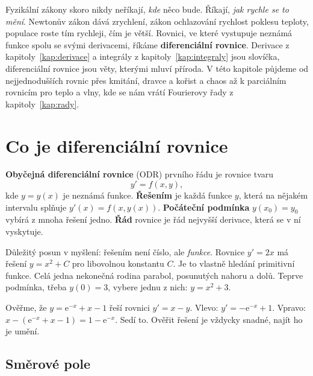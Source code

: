 \label{kap:diferencialni}

Fyzikální zákony skoro nikdy neříkají, \textit{kde} něco bude. Říkají, \textit{jak rychle se to mění}. Newtonův zákon dává zrychlení, zákon ochlazování rychlost poklesu teploty, populace roste tím rychleji, čím je větší. Rovnici, ve které vystupuje neznámá funkce spolu se svými derivacemi, říkáme \textbf{diferenciální rovnice}. Derivace z kapitoly~\ref{kap:derivace} a integrály z kapitoly~\ref{kap:integraly} jsou slovíčka, diferenciální rovnice jsou věty, kterými mluví příroda. V této kapitole půjdeme od nejjednodušších rovnic přes kmitání, dravce a kořist a chaos až k parciálním rovnicím pro teplo a vlny, kde se nám vrátí Fourierovy řady z kapitoly~\ref{kap:rady}.

\section{Co je diferenciální rovnice}

\begin{definitionbox}
  \textbf{Obyčejná diferenciální rovnice} (ODR) prvního řádu je rovnice tvaru
  \begin{equation*}
    y' = f(x, y),
  \end{equation*}
  kde $y = y(x)$ je neznámá funkce. \textbf{Řešením} je každá funkce $y$, která na nějakém intervalu splňuje $y'(x) = f(x, y(x))$. \textbf{Počáteční podmínka} $y(x_0) = y_0$ vybírá z mnoha řešení jedno. \textbf{Řád} rovnice je řád nejvyšší derivace, která se v ní vyskytuje.
\end{definitionbox}

Důležitý posun v myšlení: řešením není číslo, ale \textit{funkce}. Rovnice $y' = 2x$ má řešení $y = x^2 + C$ pro libovolnou konstantu $C$. Je to vlastně hledání primitivní funkce. Celá jedna nekonečná rodina parabol, posunutých nahoru a dolů. Teprve podmínka, třeba $y(0) = 3$, vybere jednu z nich: $y = x^2 + 3$.

\begin{example}
  Ověřme, že $y = \mathrm{e}^{-x} + x - 1$ řeší rovnici $y' = x - y$. Vlevo: $y' = -\mathrm{e}^{-x} + 1$. Vpravo: $x - (\mathrm{e}^{-x} + x - 1) = 1 - \mathrm{e}^{-x}$. Sedí to. Ověřit řešení je vždycky snadné, najít ho je umění.
\end{example}

\subsection{Směrové pole}

